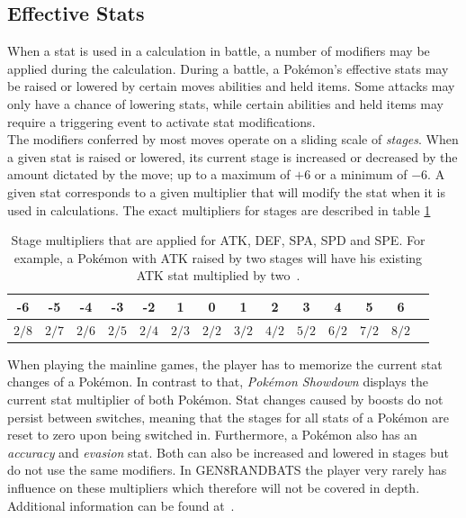 \subsection{Effective Stats}
\label{sec:boosting}
When a stat is used in a calculation in battle, a number of modifiers may be applied during the calculation.
During a battle, a Pokémon's effective stats may be raised or lowered by certain moves abilities and 
held items. Some attacks may only have a chance of lowering stats, while certain abilities and held items
may require a triggering event to activate stat modifications. \\
The modifiers conferred by most moves operate on a sliding scale of \textit{stages}. When a given stat is raised
or lowered, its current stage is increased or decreased by the amount dictated by the move; up to a maximum
of $+6$ or a minimum of $-6$. A given stat corresponds to a given multiplier that will modify the stat when it
is used in calculations. The exact multipliers for stages are described in table \ref{tab:boost-stage-multipliers}
\begin{table}[h]
	\centering
	\caption{Stage multipliers that are applied for \ac{ATK}, \ac{DEF}, \ac{SPA}, \ac{SPD} and \ac{SPE}.
	For example, a Pokémon with \ac{ATK} raised by two stages will have his existing \ac{ATK} stat multiplied by
	two~\autocite{Bulbapedia:Stat}.}
	\begin{tabular}{|c|c|c|c|c|c|c|c|c|c|c|c|c|c|}
		\hline
		-6 & -5 & -4 & -3 & -2 & 1 & 0 & 1 & 2 & 3 & 4 & 5 & 6 \\
		\hline
		$2/8$ & $2/7$ & $2/6$ & $2/5$ & $2/4$ & $2/3$ & $2/2$ &  $3/2$ &  $4/2$ &  $5/2$ &  $6/2$ &  $7/2$ & $8/2$ \\
		\hline
	\end{tabular} 
	\label{tab:boost-stage-multipliers}
\end{table}
When playing the mainline games, the player has to memorize the current stat changes of a Pokémon. In contrast to that,
\textit{Pokémon Showdown} displays the current stat multiplier of both Pokémon. Stat changes caused by boosts do not persist
between switches, meaning that the stages for all stats of a Pokémon are reset to zero upon being switched in.
Furthermore, a Pokémon also has an \textit{accuracy} and \textit{evasion} stat. Both
can also be increased and lowered in stages but do not use the same modifiers. In \ac{GEN8RANDBATS} the player very
rarely has influence on these multipliers which therefore will not be covered in depth. Additional information can be
found at~\autocite{Bulbapedia:Accuracy}.

